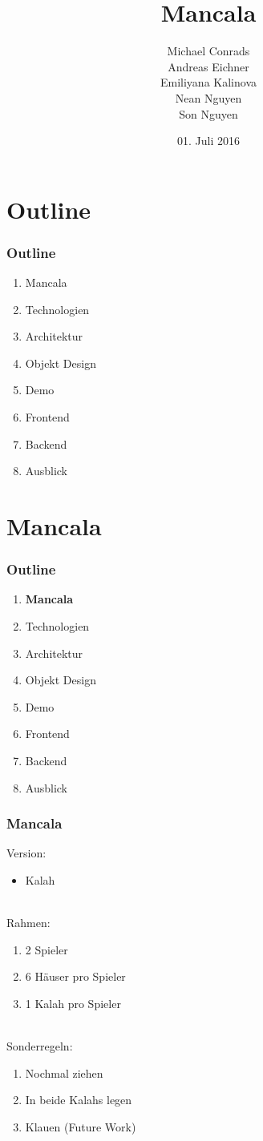 \documentclass[
	10pt,
	t		%
]{beamer}
\title{Mancala}
\subtitle{}
\author{Michael Conrads \\ Andreas Eichner \\ Emiliyana Kalinova \\ Nean Nguyen \\ Son Nguyen}
\date{01. Juli 2016}
\begin{document}
\AddToShipoutPicture{\TitlePicture}
\maketitle
\ClearShipoutPicture
\AddToShipoutPicture{\BackgroundPicture}

\section{Outline}
\begin{frame}
\frametitle{Outline}
\begin{enumerate}
\item Mancala
\item Technologien
\item Architektur
\item Objekt Design
\item Demo
\item Frontend
\item Backend
\item Ausblick
\end{enumerate}
\end{frame}

\section{Mancala}
\begin{frame}
\frametitle{Outline}
\begin{enumerate}
\item \textbf{Mancala}
\item Technologien
\item Architektur
\item Objekt Design
\item Demo
\item Frontend
\item Backend
\item Ausblick
\end{enumerate}
\end{frame}

\begin{frame}
\frametitle{Mancala}
Version:
\begin{itemize}
\item Kalah
\end{itemize}
\hfill \\[0.4cm]
Rahmen:
\begin{enumerate}
	\item 2 Spieler
	\item 6 H\"auser pro Spieler
	\item 1 Kalah pro Spieler
\end{enumerate}
\hfill \\[0.4cm]
Sonderregeln:
\begin{enumerate}
	\item Nochmal ziehen
	\item In beide Kalahs legen
	\item Klauen (Future Work)
\end{enumerate}
\end{frame}
\end{document}
